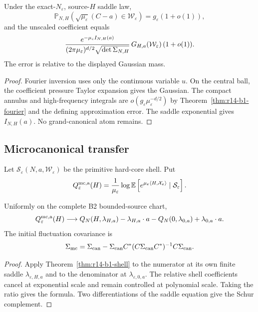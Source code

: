 \begin{theorem}
\label{thm:r14-b1-shell}
Under the exact-\(N_\varepsilon\), source-\(H\) saddle law,
\[
 \mathbb P_{N,H}
 \left(
 \sqrt{\mu_\varepsilon}(C-a)\in\mathcal W_\varepsilon
 \right)
 =
 g_\varepsilon(1+o(1)),
\]
and the unscaled coefficient equals
\[
 {e^{-\mu_\varepsilon I_{N,H}(a)}
  \over(2\pi\mu_\varepsilon)^{d/2}
        \sqrt{\det\Sigma_{N,H}}}
 \,G_{H,a}(\mathcal W_\varepsilon)\,(1+o(1)).
\]
The error is relative to the displayed Gaussian mass.
\end{theorem}

\begin{proof}
Fourier inversion uses only the continuous variable \(u\).  On the central
ball, the coefficient pressure Taylor expansion gives the Gaussian.  The
compact annulus and high-frequency integrals are
\(o(g_\varepsilon\mu_\varepsilon^{-d/2})\) by
Theorem~\ref{thm:r14-b1-fourier} and the defining approximation error.
The saddle exponential gives \(I_{N,H}(a)\).  No grand-canonical atom remains.
\end{proof}

\subsection{Microcanonical transfer}

Let \(\mathcal S_{\varepsilon}(N,a,\mathcal W_\varepsilon)\) be the primitive
hard-core shell.  Put
\[
 Q^{\rm mc,a}_\varepsilon(H)
 ={1\over\mu_\varepsilon}
 \log\mathbb E
 \left[
 e^{\mu_\varepsilon\langle H,\mathcal X_\varepsilon\rangle}
 \mid\mathcal S_\varepsilon
 \right].
\]

\begin{theorem}
\label{thm:r14-b1-main}
Uniformly on the complete B2 bounded-source chart,
\[
 Q^{\rm mc,a}_\varepsilon(H)\longrightarrow
 Q_N(H,\lambda_{H,a})-\lambda_{H,a}\cdot a
 -Q_N(0,\lambda_{0,a})+\lambda_{0,a}\cdot a .
\]
The initial fluctuation covariance is
\[
 \Sigma_{\rm mc}
 =\Sigma_{\rm can}
 -\Sigma_{\rm can}C^*
  (C\Sigma_{\rm can}C^*)^{-1}C\Sigma_{\rm can}.
\]
\end{theorem}

\begin{proof}
Apply Theorem~\ref{thm:r14-b1-shell} to the numerator at its own finite saddle
\(\lambda_{\varepsilon,H,a}\) and to the denominator at
\(\lambda_{\varepsilon,0,a}\).  The relative shell coefficients cancel at
exponential scale and remain controlled at polynomial scale.  Taking the
ratio gives the formula.  Two differentiations of the saddle equation give
the Schur complement.
\end{proof}

